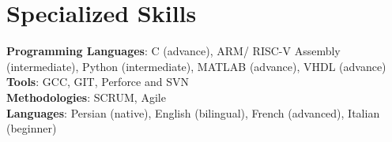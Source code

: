 \documentclass[letterpaper,11pt]{article}
\begin{document}
\section{Specialized Skills}
\begin{itemize}[leftmargin=0.15in, label={}]
    \normalsize{\item{
     \textbf{Programming Languages}{: C (advance), ARM/ RISC-V Assembly (intermediate), Python (intermediate), MATLAB (advance), VHDL (advance)} \\
     \textbf{Tools}{: GCC, GIT, Perforce and SVN} \\
     \textbf{Methodologies}{: SCRUM, Agile} \\
     \textbf{Languages}{: Persian (native), English (bilingual), French (advanced), Italian (beginner)}\\
    }}
 \end{itemize}
\end{document}
